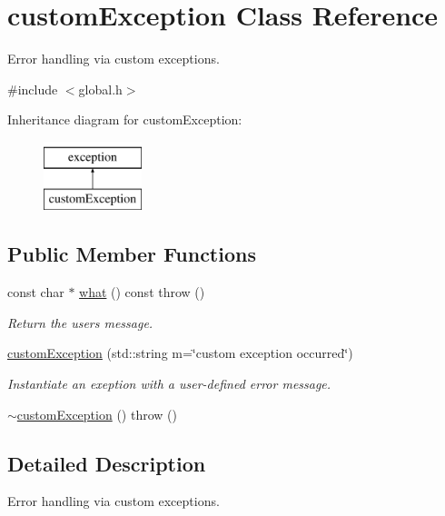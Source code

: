 \hypertarget{classcustom_exception}{}\section{custom\+Exception Class Reference}
\label{classcustom_exception}


Error handling via custom exceptions.  




{\ttfamily \#include $<$global.\+h$>$}

Inheritance diagram for custom\+Exception\+:\begin{figure}[H]
\begin{center}
\leavevmode
\includegraphics[height=2.000000cm]{classcustom_exception}
\end{center}
\end{figure}
\subsection*{Public Member Functions}
\begin{DoxyCompactItemize}
\item 
const char $\ast$ \hyperlink{classcustom_exception_aeb6ab5848b038adfc68fde86a512f691}{what} () const   throw ()
\begin{DoxyCompactList}\small\item\em Return the user\textquotesingle{}s message. \end{DoxyCompactList}\item 
\hyperlink{classcustom_exception_a02ff9f09c4dd8c0b62fb1b6438d7d71a}{custom\+Exception} (std\+::string m=\char`\"{}custom exception occurred\char`\"{})
\begin{DoxyCompactList}\small\item\em Instantiate an exeption with a user-\/defined error message. \end{DoxyCompactList}\item 
\hyperlink{classcustom_exception_a361fad49d4068f3d5fe8d4a1a962791a}{$\sim$custom\+Exception} ()  throw ()
\end{DoxyCompactItemize}


\subsection{Detailed Description}
Error handling via custom exceptions. 

